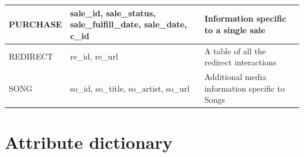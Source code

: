\documentclass[11pt, a4paper]{report}
\begin{document}
\begin{longtable}{|l|p{4cm}|p{7cm}|}
PURCHASE            & sale\_id, sale\_status, sale\_fulfill\_date, sale\_date, c\_id               & Information specific to a single sale                  \\ \hline
REDIRECT            & re\_id, re\_url                                                              & A table of all the redirect interactions               \\ \hline 
SONG                & so\_id, so\_title, so\_artist, so\_url                                       & Additional media information specific to Songs         \\ \hline
\end{longtable}

\clearpage
\section{Attribute dictionary}
\end{document}
